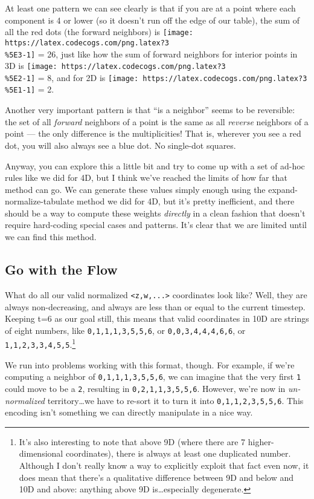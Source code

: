 \documentclass[]{article}
\begin{document}
At least one pattern we can see clearly is that if you are at a point where each
component is 4 or lower (so it doesn't run off the edge of our table), the sum
of all the red dots (the forward neighbors) is
\texttt{[image: https://latex.codecogs.com/png.latex?3\\\%5E3-1]} = 26, just like
how the sum of forward neighbors for interior points in 3D is
\texttt{[image: https://latex.codecogs.com/png.latex?3\\\%5E2-1]} = 8, and for 2D
is \texttt{[image: https://latex.codecogs.com/png.latex?3\\\%5E1-1]} = 2.

Another very important pattern is that ``is a neighbor'' seems to be reversible:
the set of all \emph{forward} neighbors of a point is the same as all
\emph{reverse} neighbors of a point --- the only difference is the
multiplicities! That is, wherever you see a red dot, you will also always see a
blue dot. No single-dot squares.

Anyway, you can explore this a little bit and try to come up with a set of
ad-hoc rules like we did for 4D, but I think we've reached the limits of how far
that method can go. We can generate these values simply enough using the
expand-normalize-tabulate method we did for 4D, but it's pretty inefficient, and
there should be a way to compute these weights \emph{directly} in a clean
fashion that doesn't require hard-coding special cases and patterns. It's clear
that we are limited until we can find this method.

\hypertarget{go-with-the-flow}{%
\subsection{Go with the Flow}\label{go-with-the-flow}}

What do all our valid normalized \texttt{\textless{}z,w,...\textgreater{}}
coordinates look like? Well, they are always non-decreasing, and always are less
than or equal to the current timestep. Keeping t=6 as our goal still, this means
that valid coordinates in 10D are strings of eight numbers, like
\texttt{0,1,1,1,3,5,5,6}, or \texttt{0,0,3,4,4,4,6,6}, or
\texttt{1,1,2,3,3,4,5,5}.\footnote{It's also interesting to note that above 9D
  (where there are 7 higher-dimensional coordinates), there is always at least
  one duplicated number. Although I don't really know a way to explicitly
  exploit that fact even now, it does mean that there's a qualitative difference
  between 9D and below and 10D and above: anything above 9D is\ldots especially
  degenerate.}

We run into problems working with this format, though. For example, if we're
computing a neighbor of \texttt{0,1,1,1,3,5,5,6}, we can imagine that the very
first \texttt{1} could move to be a \texttt{2}, resulting in
\texttt{0,2,1,1,3,5,5,6}. However, we're now in \emph{un-normalized}
territory\ldots we have to re-sort it to turn it into \texttt{0,1,1,2,3,5,5,6}.
This encoding isn't something we can directly manipulate in a nice way.
\end{document}

